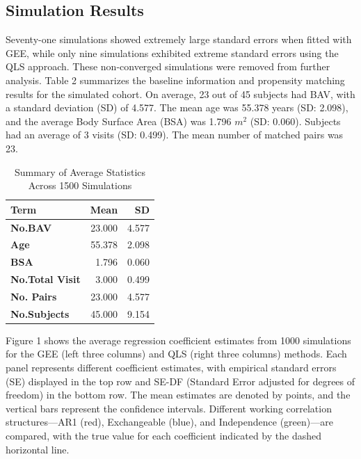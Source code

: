 \documentclass[
]{aft}
\begin{document}
\subsection{Simulation Results}\label{simulation-results}

Seventy-one simulations showed extremely large standard errors when
fitted with GEE, while only nine simulations exhibited extreme standard
errors using the QLS approach. These non-converged simulations were
removed from further analysis. Table 2 summarizes the baseline
information and propensity matching results for the simulated cohort. On
average, 23 out of 45 subjects had BAV, with a standard deviation (SD)
of 4.577. The mean age was 55.378 years (SD: 2.098), and the average
Body Surface Area (BSA) was 1.796 \(m^2\) (SD: 0.060). Subjects had an
average of 3 visits (SD: 0.499). The mean number of matched pairs was
23.

\begingroup\fontsize{8}{10}\selectfont

\begin{longtable}[t]{>{}lrr}
\caption{\footnotesize Summary of Average Statistics Across 1500 Simulations}\\
\toprule
Term & Mean & SD\\
\midrule
\textbf{No.BAV} & 23.000 & 4.577\\
\textbf{Age} & 55.378 & 2.098\\
\textbf{BSA} & 1.796 & 0.060\\
\textbf{No.Total Visit} & 3.000 & 0.499\\
\textbf{No. Pairs} & 23.000 & 4.577\\
\addlinespace
\textbf{No.Subjects} & 45.000 & 9.154\\
\bottomrule
\end{longtable}
\endgroup{}

Figure 1 shows the average regression coefficient estimates from 1000
simulations for the GEE (left three columns) and QLS (right three
columns) methods. Each panel represents different coefficient estimates,
with empirical standard errors (SE) displayed in the top row and SE-DF
(Standard Error adjusted for degrees of freedom) in the bottom row. The
mean estimates are denoted by points, and the vertical bars represent
the confidence intervals. Different working correlation structures---AR1
(red), Exchangeable (blue), and Independence (green)---are compared,
with the true value for each coefficient indicated by the dashed
horizontal line.
\end{document}
